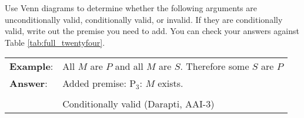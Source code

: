 \practiceproblems
\noindent \problempart Use Venn diagrams to determine whether the following arguments are unconditionally valid, conditionally valid, or invalid. If they are conditionally valid, write out the premise you need to add. You can check your answers against Table \ref{tab:full_twentyfour}.

\begin{longtabu}{p{.1\linewidth}p{.9\linewidth}}
\textbf{Example}: & All $M$ are $P$ and all $M$ are $S$. Therefore some $S$ are $P$ \\
\textbf{Answer}: & Added premise: P$_3$: $M$ exists. \\
& \begin{center}
\end{center}
\\ &
Conditionally valid (Darapti, AAI-3)
\end{longtabu}


